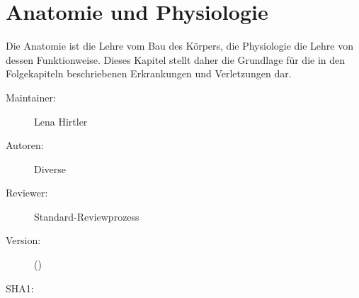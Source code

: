 \def\ChapterCode{ANA}
\chapter
[\CC{ANA} Anatomie und Physiologie]
{Anatomie und Physiologie}
\label{chp:ANA}

\ChapterIntro
{%
Die Anatomie ist die Lehre vom Bau des Körpers, die
Physiologie die Lehre von dessen Funktionweise. Dieses
Kapitel stellt daher die Grundlage für die in den
Folgekapiteln beschriebenen Erkrankungen und Verletzungen
dar.
} {%
\begin{description}
  \item[Maintainer:] Lena Hirtler
  \item[Autoren:] Diverse
  \item[Reviewer:] Standard-Reviewprozess
  \item[Version:] {\DocVersion} ({\DocVersionInfo})
  \item[SHA1:] {\DocGitCommit}
\end{description}

{\TxTeilkapitelAASS}
}

\nocite{AumuellerAnatomie2}%
\nocite{BenninghoffAnatomie17Bd1}%
\nocite{LeohnhardtAnatomie3}
\nocite{LippertAnatomie7}%
\nocite{PlatzerTaschenatlasAnat8Bd1}%
\nocite{WaldeyerAnatomie17}%

% 

